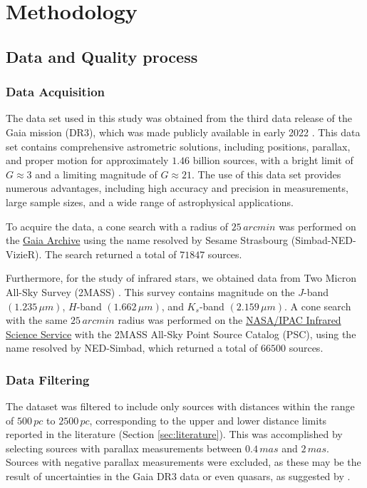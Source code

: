 \documentclass[fleqn,usenatbib,usedcolumn,useAMS]{mnras}
\begin{document}
\section{Methodology}\label{methods}
\subsection{Data and Quality process}
\subsubsection{Data Acquisition}

The data set used in this study was obtained from the third data release of the Gaia mission (DR3), which was made publicly available in early 2022 \citep{2016A&A...595A...1G,2022arXiv220800211G}. This data set contains comprehensive astrometric solutions, including positions, parallax, and proper motion for approximately $1.46$ billion sources, with a bright limit of $G \approx 3$ and a limiting magnitude of $G \approx 21$. The use of this data set provides numerous advantages, including high accuracy and precision in measurements, large sample sizes, and a wide range of astrophysical applications.

To acquire the data, a cone search with a radius of $25\,arcmin$ was performed on the \href{https://gea.esac.esa.int/archive/}{Gaia Archive} using the name resolved by Sesame Strasbourg (Simbad-NED-VizieR). The search returned a total of $71847$ sources.

Furthermore, for the study of infrared stars, we obtained data from Two Micron All-Sky Survey (2MASS) \citep{2006AJ....131.1163S}. This survey contains magnitude on the $J$-band $(1.235\,\mu m)$, $H$-band $(1.662\,\mu m)$, and $K_s$-band $(2.159\,\mu m)$. A cone search with the same $25\,arcmin$ radius was performed on the \href{https://irsa.ipac.caltech.edu/Missions/2mass.html}{NASA/IPAC Infrared Science Service} with the 2MASS All-Sky Point Source Catalog (PSC), using the name resolved by NED-Simbad, which returned a total of $66500$ sources.

\subsubsection{Data Filtering}
The dataset was filtered to include only sources with distances within the range of $500\,pc$ to $2500\,pc$, corresponding to the upper and lower distance limits reported in the literature (Section \ref{sec:literature}). This was accomplished by selecting sources with parallax measurements between $0.4\,mas$ and $2\,mas$. Sources with negative parallax measurements were excluded, as these may be the result of uncertainties in the Gaia DR3 data or even quasars, as suggested by \citet{2018A&A...616A...9L}.
\end{document}
